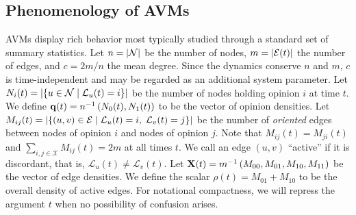 \documentclass[review, onefignum, onetabnum]{siamart171218}
\begin{document}
	\subsection{Phenomenology of AVMs}
		AVMs display rich behavior most typically studied through a standard set of summary statistics.  
		Let $n = \left|\mathcal{N}\right|$ be the number of nodes, $m = \left|\mathcal{E}(t)\right|$ the number of edges, and $c = {2m}/{n}$ the mean degree.
		Since the dynamics conserve $n$ and $m$, $c$ is time-independent and may be regarded as an additional system parameter. 
		Let $N_i(t) = \left|\{u \in \mathcal{N} \;|\;\mathcal{L}_u(t) = i \}\right|$ be the number of nodes holding opinion $i$ at time $t$. 
		We define $\mathbf{q}(t) = n^{-1}\left(N_0(t), N_1(t)\right)$ to be the vector of opinion densities.
		Let $M_{ij}(t) = \left|\{(u,v) \in \mathcal{E} \;|\; \mathcal{L}_u(t) = i,\; \mathcal{L}_v(t) = j \}\right|$ be the number of \emph{oriented} edges between nodes of opinion $i$ and nodes of opinion $j$. 
		Note that $M_{ij}(t) = M_{ji}(t)$ and $\sum_{i,j \in \mathcal{X}} M_{ij}(t) = 2m$ at all times $t$.
		We call an edge $(u,v)$ ``active'' if it is discordant, that is, $\mathcal{L}_u(t) \neq \mathcal{L}_v(t)$. 
		Let $\mathbf{X}(t) = m^{-1}\left(M_{00}, M_{01}, M_{10}, M_{11}\right)$ be the vector of edge densities. 
		We define the scalar $\rho(t) = M_{01} + M_{10}$ to be the overall density of active edges. 
		For notational compactness, we will repress the argument $t$ when no possibility of confusion arises.
		
\end{document}
